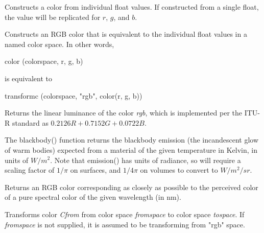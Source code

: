 \documentclass[11pt,letterpaper]{book}
\def\color{{\cf color}\xspace}
\def\float{{\cf float}\xspace}
\def\rgbspace{{\cf "rgb"} space\xspace}
\begin{document}
Constructs a \color from individual \float values.  If constructed
from a single \float, the value will be replicated for $r$, $g$, and $b$.
\apiend

Constructs an RGB \color that is equivalent to the individual \float values in a
named color space.  In other words,
\begin{code}
    color (colorspace, r, g, b)
\end{code}
\noindent is equivalent to
\begin{code}
    transformc (colorspace, "rgb", color(r, g, b))
\end{code}
\apiend

Returns the linear luminance of the color \emph{rgb}, which is
implemented per the ITU-R standard as $0.2126 R + 0.7152 G + 0.0722 B$.
\apiend


The {\cf blackbody()} function returns the blackbody emission (the
incandescent glow of warm bodies) expected from a material of the given
temperature in Kelvin, in units of $W/m^2$. Note that {\cf emission()} has units
of radiance, so will require a scaling factor of $1/\pi$ on surfaces, and
$1/4\pi$ on volumes to convert to $W/m^2/sr$.
\apiend

Returns an RGB color corresponding as closely as possible to the
perceived color of a pure spectral color of the given wavelength (in nm).
\apiend

Transforms color \emph{Cfrom} from color space \emph{fromspace} to
color space \emph{tospace}.  If \emph{fromspace} is not supplied,
it is assumed to be transforming from \rgbspace.

\apiend
\end{document}
